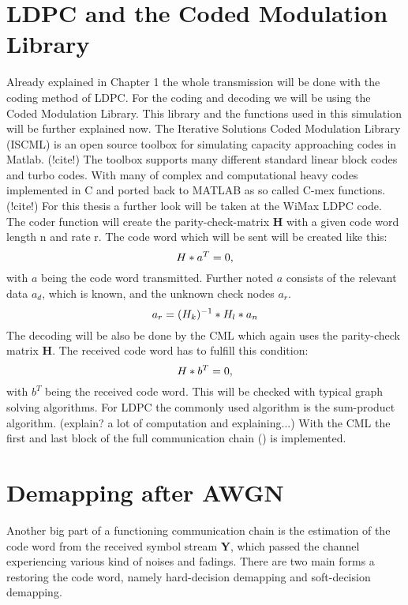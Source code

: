 \section{LDPC and the Coded Modulation Library}
Already explained in Chapter 1 the whole transmission will be done with the coding method of \gls{LDPC}. For the coding and decoding we will be using the Coded Modulation Library. This library and the functions used in this simulation will be further explained now.
\newline
The Iterative Solutions Coded Modulation Library (ISCML) is an open source toolbox for simulating capacity approaching codes in Matlab. (!cite!) The toolbox supports many different standard linear block codes and turbo codes. With many of complex and computational heavy codes implemented in C and ported back to MATLAB as so called C-mex functions. (!cite!)
\newline 
For this thesis a further look will be taken at the WiMax LDPC code. The coder function will create the parity-check-matrix \textbf{H} with a given code word length n and rate r. The code word which will be sent will be created like this:
\begin{equation}
\label{eq:LDPC1}
\boldmath{H}*a^T = 0,
\end{equation}
with $a$ being the code word transmitted. Further noted $a$ consists of the relevant data $a_{d}$, which is known, and the unknown check nodes $a_{r}$. 
\begin{equation}
\label{eq:LDPC2}
a_r = (\boldmath{H}_k)^{-1} * H_l * a_n
\end{equation}
The decoding will be also be done by the \gls{CML} which again uses the parity-check matrix \textbf{H}. The received code word has to fulfill this condition:
\begin{equation}
\label{eq:LDPC3}
\boldmath{H}*b^T = 0,
\end{equation}
with $b^T$ being the received code word. This will be checked with typical graph solving algorithms. For LDPC the commonly used algorithm is the sum-product algorithm. (explain? a lot of computation and explaining...)
With the \gls{CML} the first and last block of the full communication chain () is implemented.
\section{Demapping after AWGN}
Another big part of a functioning communication chain is the estimation of the code word from the received symbol stream \textbf{Y}, which passed the channel experiencing various kind of noises and fadings. There are two main forms a restoring the code word, namely hard-decision demapping and soft-decision demapping.
